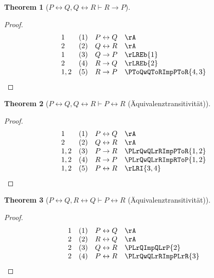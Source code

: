 \documentclass{book}
\theoremstyle{plain}
\newtheorem{theorem}{Theorem}
\theoremstyle{remark}
\theoremstyle{definition}
\begin{document}
\label{PLrQwQLrRImpRToP}
\begin{theorem}[\(P \leftrightarrow Q, Q \leftrightarrow R \vdash R \rightarrow P\)]
\end{theorem}
\begin{proof}
	\[
	\begin{array}{llll}
		1 & (1) & P \leftrightarrow Q & \rA \\
		2 & (2) & Q \leftrightarrow R & \rA \\
		1 & (3) & Q \rightarrow P & \rLREb{1} \\
		2 & (4) & R \rightarrow Q & \rLREb{2} \\
		1,2 & (5) & R \rightarrow P & \PToQwQToRImpPToR{4,3} \\
	\end{array}
	\]
\end{proof}

\label{PLrQwQLrRImpPLrR}
\begin{theorem}[\(P \leftrightarrow Q, Q \leftrightarrow R \vdash P \leftrightarrow R\) (Äquivalenztransitivität)]
\end{theorem}
\begin{proof}
	\[
	\begin{array}{llll}
		1   & (1) & P \leftrightarrow Q & \rA \\
		2   & (2) & Q \leftrightarrow R & \rA \\
		1,2 & (3) & P \rightarrow R & \PLrQwQLrRImpPToR{1,2} \\
		1,2 & (4) & R \rightarrow P & \PLrQwQLrRImpRToP{1,2} \\
		1,2 & (5) & P \leftrightarrow R & \rLRI{3,4} \\
	\end{array}
	\]
\end{proof}

\label{PLrQwRLrQImpPLrR}
\begin{theorem}[\(P \leftrightarrow Q, R \leftrightarrow Q \vdash P \leftrightarrow R\) (Äquivalenztransitivität)]
\end{theorem}
\begin{proof}
	\[
	\begin{array}{llll}
		1 & (1) & P \leftrightarrow Q & \rA \\
		2 & (2) & R \leftrightarrow Q & \rA \\
            2 & (3) & Q \leftrightarrow R & \PLrQImpQLrP{2} \\
            2 & (4) & P \leftrightarrow R & \PLrQwQLrRImpPLrR{3} \\
	\end{array}
	\]
\end{proof}
\end{document}
